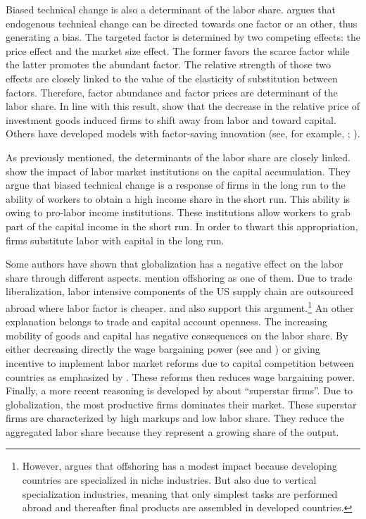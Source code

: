 Biased technical change is also a determinant of the labor share. \cite{Acemoglu2002} argues that endogenous technical change can be directed towards one factor or an other, thus generating a bias. The targeted factor is determined by two competing effects: the price effect and the market size effect. The former favors the scarce factor while the latter promotes the abundant factor. The relative strength of those two effects are closely linked to the value of the elasticity of substitution between factors. Therefore, factor abundance and factor prices are determinant of the labor share. In line with this result, \cite{Karabarbounis2014} show that the decrease in the relative price of investment goods induced firms to shift away from labor and toward capital. Others have developed models with factor-saving innovation (see, for example, \citealt{Zuleta2008}; \citealt{Peretto2013}).

As previously mentioned, the determinants of the labor share are closely linked. \cite{Caballero1998} show the impact of labor market institutions on the capital accumulation. They argue that biased technical change is a response of firms in the long run to the ability of workers to obtain a high income share in the short run. This ability is owing to pro-labor income institutions. These institutions allow workers to grab part of the capital income in the short run. In order to thwart this appropriation, firms substitute labor with capital in the long run.

Some authors have shown that globalization has a negative effect on the labor share through different aspects. \cite{Elsby2013} mention offshoring as one of them. Due to trade liberalization, labor intensive components of the US supply chain are outsourced abroad where labor factor is cheaper. \cite{Krugman2008} and \cite{Bassanini2014} also support this argument.\footnote{However, \cite{Krugman2008} argues that offshoring has a modest impact because developing countries are specialized in niche industries. But also due to vertical specialization industries, meaning that only simplest tasks are performed abroad and thereafter final products are assembled in developed countries.} An other explanation belongs to trade and capital account openness. The increasing mobility of goods and capital has negative consequences on the labor share. By either decreasing directly the wage bargaining power (see \citealt{Jayadev2007} and \citealt{Young2018}) or giving incentive to implement labor market reforms due to capital competition between countries as emphasized by \cite{Pica2010}. These reforms then reduces wage bargaining power. Finally, a more recent reasoning is developed by \cite{Autor2019} about ``superstar firms''. Due to globalization, the most productive firms dominates their market. These superstar firms are characterized by high markups and low labor share. They reduce the aggregated labor share because they represent a growing share of the output.









